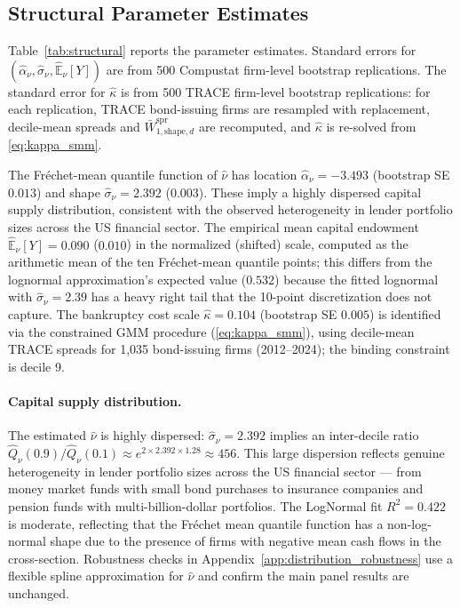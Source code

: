 \subsection{Structural Parameter Estimates}

Table~\ref{tab:structural} reports the parameter estimates. Standard errors for $(\hat{\alpha}_\nu, \hat{\sigma}_\nu, \hat{\mathbb{E}}_\nu[Y])$ are from 500 Compustat firm-level bootstrap replications. The standard error for $\hat{\kappa}$ is from 500 TRACE firm-level bootstrap replications: for each replication, TRACE bond-issuing firms are resampled with replacement, decile-mean spreads and $\bar{W}_{1,\text{shape},d}^{\text{spr}}$ are recomputed, and $\hat{\kappa}$ is re-solved from \eqref{eq:kappa_smm}.



The Fr\'{e}chet-mean quantile function of $\hat{\nu}$ has location $\hat{\alpha}_\nu = -3.493$ (bootstrap SE $0.013$) and shape $\hat{\sigma}_\nu = 2.392$ ($0.003$). These imply a highly dispersed capital supply distribution, consistent with the observed heterogeneity in lender portfolio sizes across the US financial sector. The empirical mean capital endowment $\hat{\mathbb{E}}_\nu[Y] = 0.090$ ($0.010$) in the normalized (shifted) scale, computed as the arithmetic mean of the ten Fr\'{e}chet-mean quantile points; this differs from the lognormal approximation's expected value ($0.532$) because the fitted lognormal with $\hat{\sigma}_\nu = 2.39$ has a heavy right tail that the 10-point discretization does not capture. The bankruptcy cost scale $\hat{\kappa} = 0.104$ (bootstrap SE $0.005$) is identified via the constrained GMM procedure (\eqref{eq:kappa_smm}), using decile-mean TRACE spreads for 1,035 bond-issuing firms (2012--2024); the binding constraint is decile 9.

\paragraph{Capital supply distribution.}
The estimated $\hat{\nu}$ is highly dispersed: $\hat{\sigma}_\nu = 2.392$ implies an inter-decile ratio $\hat{Q}_\nu(0.9)/\hat{Q}_\nu(0.1) \approx e^{2 \times 2.392 \times 1.28} \approx 456$. This large dispersion reflects genuine heterogeneity in lender portfolio sizes across the US financial sector — from money market funds with small bond purchases to insurance companies and pension funds with multi-billion-dollar portfolios. The LogNormal fit $R^2 = 0.422$ is moderate, reflecting that the Fr\'{e}chet mean quantile function has a non-log-normal shape due to the presence of firms with negative mean cash flows in the cross-section. Robustness checks in Appendix~\ref{app:distribution_robustness} use a flexible spline approximation for $\hat{\nu}$ and confirm the main panel results are unchanged.

